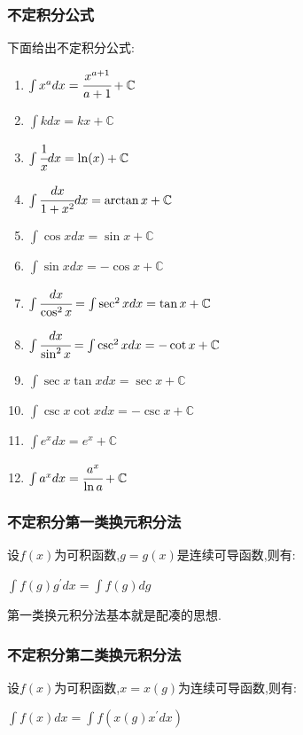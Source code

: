 \documentclass[UTF8,12pt]{ctexbook}
\newcommand{\derivative}{^\prime}
\newcommand{\defFunction}[1]{f(#1)}
\newcommand{\mathConstant}{\mathbb{C}}
\begin{document}
{{{  \subsubsection{不定积分公式}{
    下面给出不定积分公式:

    \begin{enumerate}
      \item $\int x^adx = \cfrac{x^{a+1}}{a+1} + \mathConstant$
      \item $\int kdx = kx + \mathConstant$
      \item $\int \cfrac{1}{x}dx = \ln(x) + \mathConstant$
      \item $\int \cfrac{dx}{1+x^2}dx = \arctan x + \mathConstant$
      \item $\int \cos xdx = \sin x + \mathConstant$
      \item $\int \sin xdx = -\cos x + \mathConstant$
      \item $\int \cfrac{dx}{\cos^2x} = \int \sec^2xdx = \tan x + \mathConstant$
      \item $\int \cfrac{dx}{\sin^2x} = \int\csc^2xdx = -\cot x + \mathConstant$
      \item $\int \sec x\tan xdx = \sec x + \mathConstant$
      \item $\int \csc x\cot xdx = -\csc x + \mathConstant$
      \item $\int e^xdx = e^x + \mathConstant$
      \item $\int a^xdx = \cfrac{a^x}{\ln a} + \mathConstant$
    \end{enumerate}

  }%

  \subsubsection{不定积分第一类换元积分法}{
    设$\defFunction{x}$为可积函数,$g = g(x)$是连续可导函数,则有:

    $\int \defFunction{g}g\derivative dx = \int \defFunction{g}dg$

    第一类换元积分法基本就是配凑的思想.

  }%

  \subsubsection{不定积分第二类换元积分法}{
    设$\defFunction{x}$为可积函数,$x = x(g)$为连续可导函数,则有:

    $\int \defFunction{x}dx = \int \defFunction{x(g)x\derivative dx}$

}}}}
\end{document}
